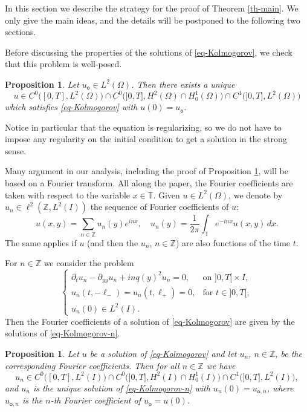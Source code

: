 \documentclass[JEP,XML,SOM,Unicode]{cedram}
\theoremstyle{plain}
\newtheorem{proposition}[theorem]{Proposition}
\theoremstyle{definition}
\newcommand{\1}{\mathds 1}
\newcommand{\Z}{\mathbb{Z}}
\newcommand{\T}{\mathbb{T}}
\let\O\Omega
\newcommand{\uo}{u_{\mathsf{o}}}
\begin{document}
In this section we describe the strategy for the proof of Theorem \ref{th-main}. We only give the main ideas, and the details will be postponed to the following two sections.


Before discussing the properties of the solutions of \eqref{eq-Kolmogorov}, we check that this problem is well-posed.

\begin{proposition} \label{prop-well-posedness}
Let $\uo \in L^2(\O)$. Then there exists a unique
\[
u \in C^0 \bigl([0,T],L^2(\O) \bigr) \cap C^0 \bigl(]0,T],H^2(\O) \cap H^1_0(\O) \bigr) \cap C^1 \bigl(]0,T], L^2(\O) \bigr)
\]
which satisfies \eqref{eq-Kolmogorov} with $u(0) = \uo$.
\end{proposition}

Notice in particular that the equation is regularizing, so we do not have to impose any regularity on the initial condition to get a solution in the strong sense.

Many argument in our analysis, including the proof of Proposition \ref{prop-well-posedness}, will be based on a Fourier transform. All along the paper, the Fourier coefficients are taken with respect to the variable $x \in \T$. Given $u \in L^2(\O)$, we denote by $u_n \in \ell^2(\Z,L^2(I))$ the sequence of Fourier coefficients of $u$:
\[
u(x,y) = \sum_{n\in \mathbb{Z}} u_n(y) e^{i n x}, \quad u_n (y) = \frac 1 {2\pi} \int_\T e^{-inx} u(x,y) \, dx.
\]
The same applies if $u$ (and then the $u_n$, $n \in \Z$) are also functions of the time $t$.

For $n \in \Z$ we consider the problem
\begin{equation} \label{eq-Kolmogorov-n}
\begin{cases}
\partial_t u_n - \partial_{yy} u_n + inq(y)^2 u_n = 0, & \text{on } ]0,T[{}\times I,\\
u_n(t,-\ell_-) = u_n(t,\ell_+) = 0, & \text{for } t \in{}]0,T[,\\
u_n(0) \in L^2(I).
\end{cases}
\end{equation}
Then the Fourier coefficients of a solution of \eqref{eq-Kolmogorov} are given by the solutions of \eqref{eq-Kolmogorov-n}.

\begin{proposition} \label{prop-well-posedness-n}
Let $u$ be a solution of \eqref{eq-Kolmogorov} and let $u_n$, $n \in \Z$, be the corresponding Fourier coefficients. Then for all $n \in \Z$ we have
\[
u_n \in C^0 \bigl([0,T],L^2(I) \bigr) \cap C^0 \bigl(]0,T],H^2(I) \cap H^1_0(I) \bigr) \cap C^1 \bigl(]0,T], L^2(I) \bigr),
\]
and $u_n$ is the unique solution of \eqref{eq-Kolmogorov-n} with $u_n(0) = u_{\mathsf{o},n}$, where $u_{\mathsf{o},n}$ is the $n$-th Fourier coefficient of $\uo = u(0)$.
\end{proposition}
\end{document}

